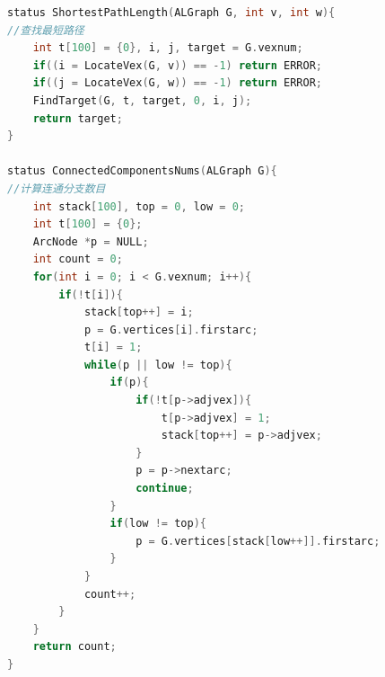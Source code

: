 \documentclass[supercite]{Experimental_Report}
\theoremstyle{definition}
\begin{document}
\begin{lstlisting}[language=c]
status ShortestPathLength(ALGraph G, int v, int w){
//查找最短路径 
	int t[100] = {0}, i, j, target = G.vexnum;
	if((i = LocateVex(G, v)) == -1) return ERROR;
    if((j = LocateVex(G, w)) == -1) return ERROR;
	FindTarget(G, t, target, 0, i, j);
	return target;
}

status ConnectedComponentsNums(ALGraph G){
//计算连通分支数目 
	int stack[100], top = 0, low = 0;
    int t[100] = {0};
    ArcNode *p = NULL;
    int count = 0;
    for(int i = 0; i < G.vexnum; i++){
        if(!t[i]){
            stack[top++] = i;
            p = G.vertices[i].firstarc;
            t[i] = 1;
            while(p || low != top){
                if(p){
                    if(!t[p->adjvex]){
                        t[p->adjvex] = 1;
                        stack[top++] = p->adjvex;
                    }
                    p = p->nextarc;
                    continue;
                }
                if(low != top){
                    p = G.vertices[stack[low++]].firstarc;
                }
            }
            count++;
        }
    }
    return count;
}


\end{lstlisting}
\end{document}
